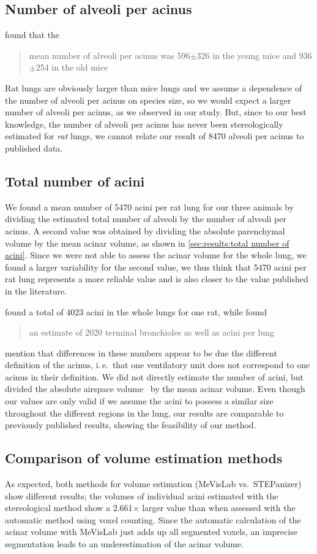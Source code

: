 \documentclass[a4paper,DIV=calc,abstract,english]{scrartcl}
\newcommand{\ie}{i.\,e.\ }
\newcommand{\meantotalnumberofaciniVariant}{5470}
\newcommand{\meannumberofalveoli}{8470} %
\newcommand{\difference}{2.661} %
\begin{document}
\subsection{Number of alveoli per acinus}
\citet{Vasilescu2012} found that the \blockquote{mean number of alveoli per acinus was 596\(\pm\)326 in the young mice and 936\(\pm\)254 in the old mice}.
Rat lungs are obviously larger than mice lungs and we assume a dependence of the number of alveoli per acinus on species size, so we would expect a larger number of alveoli per acinus, as we observed in our study.
But, since to our best knowledge, the number of alveoli per acinus has never been stereologically estimated for \emph{rat} lungs, we cannot relate our result of \meannumberofalveoli\xspace alveoli per acinus to published data.

\subsection{Total number of acini}
We found a mean number of \meantotalnumberofaciniVariant\xspace acini per rat lung for our three animals by dividing the estimated total number of alveoli by the number of alveoli per acinus.
A second value was obtained by dividing the absolute parenchymal volume by the mean acinar volume, as shown in \autoref{sec:results:total number of acini}.
Since we were not able to assess the acinar volume for the whole lung, we found a larger variability for the second value, we thus think that \meantotalnumberofaciniVariant\xspace acini per rat lung represents a more reliable value and is also closer to the value published in the literature.

\citet{Rodriguez1987} found a total of 4023 acini in the whole lungs for one rat, while \citet{Mercer1987a} found \blockquote{an estimate of 2020 terminal bronchioles as well as acini per lung}.
\citeauthor{Mercer1987a} mention that differences in these numbers appear to be due the different definition of the acinus, \ie that one ventilatory unit does not correspond to one acinus in their definition.
We did not directly estimate the number of acini, but divided the absolute airspace volume~\cite{Tschanz2003} by the mean acinar volume.
Even though our values are only valid if we assume the acini to possess a similar size throughout the different regions in the lung, our results are comparable to previously published results, showing the feasibility of our method.

\subsection{Comparison of volume estimation methods}
As expected, both methods for volume estimation (MeVisLab vs.\ STEPanizer) show different results; the volumes of individual acini estimated with the stereological method show a \difference\(\times\) larger value than when assessed with the automatic method using voxel counting.
Since the automatic calculation of the acinar volume with MeVisLab just adds up all segmented voxels, an imprecise segmentation leads to an underestimation of the acinar volume.
\end{document}
